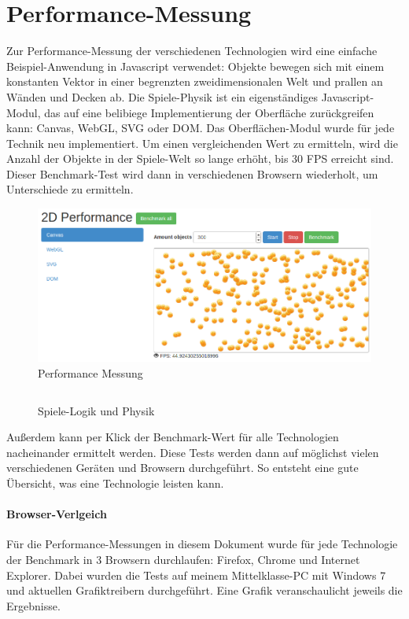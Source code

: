 \documentclass[a4paper, 12pt]{article}
\begin{document}
\section{Performance-Messung}
Zur Performance-Messung der verschiedenen Technologien wird eine einfache Beispiel-Anwendung in Javascript verwendet: Objekte bewegen sich mit einem konstanten Vektor in einer begrenzten zweidimensionalen Welt und prallen an Wänden und Decken ab. Die Spiele-Physik ist ein eigenständiges Javascript-Modul, das auf eine belibiege Implementierung der Oberfläche zurückgreifen kann: Canvas, WebGL, SVG oder DOM. Das Oberflächen-Modul wurde für jede Technik neu implementiert. Um einen vergleichenden Wert zu ermitteln, wird die Anzahl der Objekte in der Spiele-Welt so lange erhöht, bis 30 FPS erreicht sind. Dieser Benchmark-Test wird dann in verschiedenen Browsern wiederholt, um Unterschiede zu ermitteln.
\begin{figure}[h!]
	\begin{center}
		\includegraphics[width=\textwidth]{assets/demo_screenshot.png} 
	\end{center}
	\caption{Performance Messung}
	\label{performance_benchmark}
\end{figure}
\begin{figure}[h!]
	\inputminted{javascript}{assets/benchmark1.js}
	\caption{Spiele-Logik und Physik}
	\label{benchmark1}
	\newpage
\end{figure}
Außerdem kann per Klick der Benchmark-Wert für alle Technologien nacheinander ermittelt werden. Diese Tests werden dann auf möglichst vielen verschiedenen Geräten und Browsern durchgeführt. So entsteht eine gute Übersicht, was eine Technologie leisten kann.
\paragraph{Browser-Verlgeich} Für die Performance-Messungen in diesem Dokument wurde für jede Technologie der Benchmark in 3 Browsern durchlaufen: Firefox, Chrome und Internet Explorer. Dabei wurden die Tests auf meinem Mittelklasse-PC mit Windows 7 und aktuellen Grafiktreibern durchgeführt. Eine Grafik veranschaulicht jeweils die Ergebnisse.
\newpage
\end{document}
